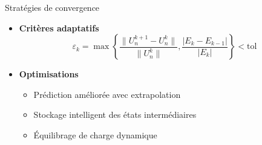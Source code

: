 \begin{frame}{Stratégies de convergence}
    \begin{itemize}
        \item \textbf{Critères adaptatifs}
        \begin{equation*}
            \varepsilon_k = \max\left\{\frac{\|U_n^{k+1} - U_n^k\|}{\|U_n^k\|}, \frac{|E_k - E_{k-1}|}{|E_k|}\right\} < \text{tol}
        \end{equation*}
        \item \textbf{Optimisations}
        \begin{itemize}
            \item Prédiction améliorée avec extrapolation
            \item Stockage intelligent des états intermédiaires
            \item Équilibrage de charge dynamique
        \end{itemize}
    \end{itemize}
\end{frame}